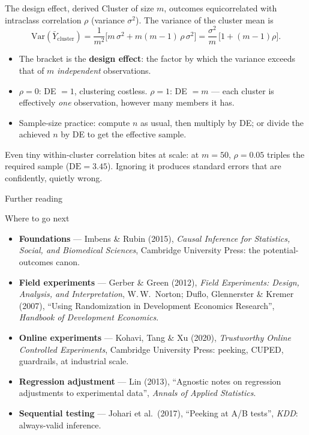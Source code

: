 \documentclass[aspectratio=169,11pt]{beamer}
\begin{document}
\begin{frame}{The design effect, derived}
  \footnotesize
  Cluster of size $m$, outcomes equicorrelated with intraclass correlation $\rho$
  (variance $\sigma^2$). The variance of the cluster mean is
  \[
    \mathrm{Var}(\bar Y_{\text{cluster}})
      = \frac{1}{m^2}\Big[m\,\sigma^2 + m(m-1)\,\rho\,\sigma^2\Big]
      = \frac{\sigma^2}{m}\,\big[1 + (m-1)\rho\big] .
  \]
  \begin{readme}
    \begin{itemize}
      \item The bracket is the \textbf{design effect}: the factor by which the variance
            exceeds that of $m$ \emph{independent} observations.
      \item $\rho=0$: DE $=1$, clustering costless. $\rho=1$: DE $=m$ --- each cluster
            is effectively \emph{one} observation, however many members it has.
      \item Sample-size practice: compute $n$ as usual, then multiply by DE; or divide
            the achieved $n$ by DE to get the effective sample.
    \end{itemize}
  \end{readme}
  \begin{takeaway}
    Even tiny within-cluster correlation bites at scale: at $m=50$, $\rho=0.05$ triples
    the required sample ($\mathrm{DE}=3.45$). Ignoring it produces standard errors that
    are confidently, quietly wrong.
  \end{takeaway}
\end{frame}

\begin{frame}{Further reading}
  \footnotesize
  \begin{block}{Where to go next}
    \begin{itemize}
      \item \textbf{Foundations} --- Imbens \& Rubin (2015), \emph{Causal Inference for
            Statistics, Social, and Biomedical Sciences}, Cambridge University Press:
            the potential-outcomes canon.
      \item \textbf{Field experiments} --- Gerber \& Green (2012), \emph{Field
            Experiments: Design, Analysis, and Interpretation}, W.\,W.\ Norton;
            Duflo, Glennerster \& Kremer (2007), ``Using Randomization in Development
            Economics Research'', \emph{Handbook of Development Economics}.
      \item \textbf{Online experiments} --- Kohavi, Tang \& Xu (2020), \emph{Trustworthy
            Online Controlled Experiments}, Cambridge University Press: peeking, CUPED,
            guardrails, at industrial scale.
      \item \textbf{Regression adjustment} --- Lin (2013), ``Agnostic notes on regression
            adjustments to experimental data'', \emph{Annals of Applied Statistics}.
      \item \textbf{Sequential testing} --- Johari et al.\ (2017), ``Peeking at A/B
            tests'', \emph{KDD}: always-valid inference.
    \end{itemize}
  \end{block}
\end{frame}
\end{document}
